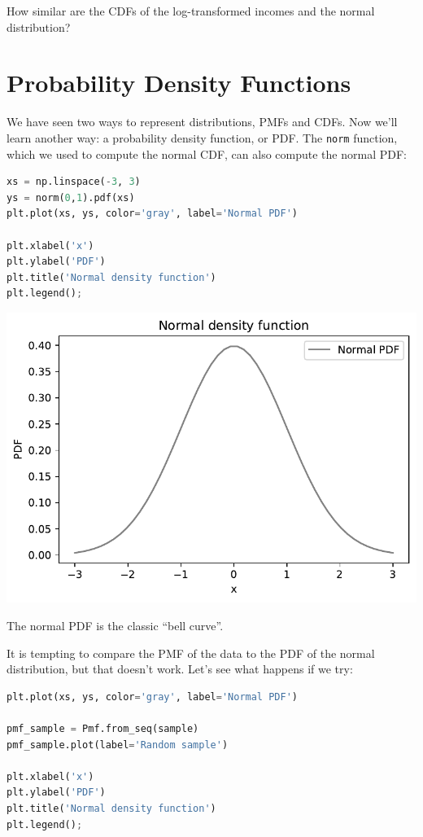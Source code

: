 How similar are the CDFs of the log-transformed incomes and the normal
distribution?

\hypertarget{probability-density-functions}{%
\section{Probability Density
Functions}\label{probability-density-functions}}

We have seen two ways to represent distributions, PMFs and CDFs. Now
we'll learn another way: a probability density function, or PDF. The
\passthrough{\lstinline!norm!} function, which we used to compute the
normal CDF, can also compute the normal PDF:

\begin{lstlisting}[language=Python]
xs = np.linspace(-3, 3)
ys = norm(0,1).pdf(xs)
plt.plot(xs, ys, color='gray', label='Normal PDF')

plt.xlabel('x')
plt.ylabel('PDF')
plt.title('Normal density function')
plt.legend();
\end{lstlisting}

\begin{center}
\includegraphics[scale=0.75]{chapters/08_distributions_files/08_distributions_121_0.pdf}
\end{center}

The normal PDF is the classic ``bell curve''.

It is tempting to compare the PMF of the data to the PDF of the normal
distribution, but that doesn't work. Let's see what happens if we try:

\begin{lstlisting}[language=Python]
plt.plot(xs, ys, color='gray', label='Normal PDF')

pmf_sample = Pmf.from_seq(sample)
pmf_sample.plot(label='Random sample')

plt.xlabel('x')
plt.ylabel('PDF')
plt.title('Normal density function')
plt.legend();
\end{lstlisting}

